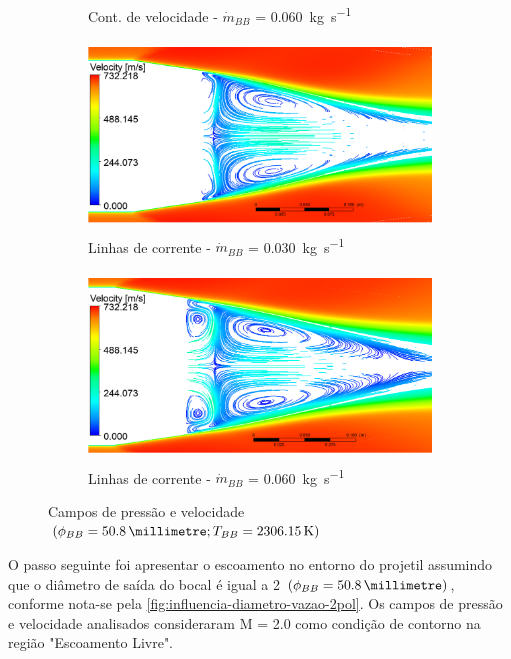 \begin{figure}[!htpb]
\begin{subfigure}[b]{0.47\textwidth}
        \caption{Cont. de velocidade - \(\Dot{m}_{BB}\) = \qty{0,060}{\kilogram\per\second}}
        \label{fig:contorno-velocidade-bb-2pol-vazao0060}
    \end{subfigure}
    \hfill
    \begin{subfigure}[b]{0.47\textwidth} %
        \centering
        \includegraphics[height=5cm,width=\textwidth]{corrente-velocidade-2306K-vazao-0030-2pol.png}
        \caption{Linhas de corrente - \(\Dot{m}_{BB}\) = \qty{0,030}{\kilogram\per\second}}
        \label{fig:corrente-velocidade-bb-2pol-vazao0030}
    \end{subfigure}
    \hfill
    \begin{subfigure}[b]{0.47\textwidth} %
        \centering
        \includegraphics[height=5cm,width=\textwidth]{corrente-velocidade-2306K-vazao-0060-2pol.png}
        \caption{Linhas de corrente - \(\Dot{m}_{BB}\) = \qty{0,060}{\kilogram\per\second}}
        \label{fig:corrente-velocidade-bb-2pol-vazao0060}
    \end{subfigure}
    \caption{Campos de pressão e velocidade \(\left(\phi_{BB} = \qty{50,8}{\millimetre}; T_{BB} = \qty{2306,15}{\kelvin}\right)\)}
	\label{fig:influencia-diametro-vazao-2pol}
\end{figure}

O passo seguinte foi apresentar o escoamento no entorno do projetil assumindo que o diâmetro de saída do bocal é igual a \qty{2}{\polegada} \(\left(\phi_{BB} = \qty{50,8}{\millimetre} \right)\), conforme nota-se pela \autoref{fig:influencia-diametro-vazao-2pol}. Os campos de pressão e velocidade analisados consideraram M = \num{2,0} como condição de contorno na região "Escoamento Livre".

